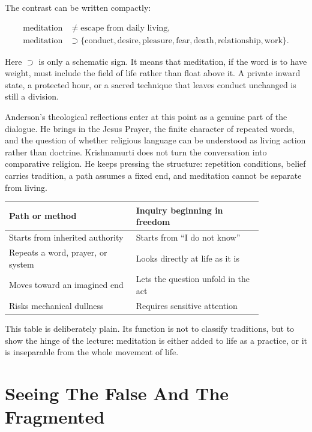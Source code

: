 The contrast can be written compactly:

\begin{align}
\text{meditation} &\neq \text{escape from daily living},\\
\text{meditation} &\supset
\{\text{conduct}, \text{desire}, \text{pleasure}, \text{fear},
\text{death}, \text{relationship}, \text{work}\}.
\end{align}

Here \(\supset\) is only a schematic sign. It means that meditation, if the word is to have weight, must include the field of life rather than float above it. A private inward state, a protected hour, or a sacred technique that leaves conduct unchanged is still a division.

Anderson's theological reflections enter at this point as a genuine part of the dialogue. He brings in the Jesus Prayer, the finite character of repeated words, and the question of whether religious language can be understood as living action rather than doctrine. Krishnamurti does not turn the conversation into comparative religion. He keeps pressing the structure: repetition conditions, belief carries tradition, a path assumes a fixed end, and meditation cannot be separate from living.

\begin{table}
\centering
\begin{tabular}{p{0.42\linewidth}p{0.42\linewidth}}
\hline
Path or method & Inquiry beginning in freedom \\
\hline
Starts from inherited authority & Starts from ``I do not know'' \\
Repeats a word, prayer, or system & Looks directly at life as it is \\
Moves toward an imagined end & Lets the question unfold in the act \\
Risks mechanical dullness & Requires sensitive attention \\
\hline
\end{tabular}
\end{table}

This table is deliberately plain. Its function is not to classify traditions, but to show the hinge of the lecture: meditation is either added to life as a practice, or it is inseparable from the whole movement of life.

\section{Seeing The False And The Fragmented}


